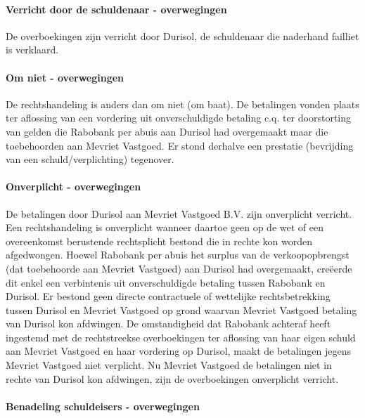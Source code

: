 \documentclass[
  dutch,
  a4paper,
]{article}
\begin{document}
\paragraph{Verricht door de schuldenaar - overwegingen}\label{verricht-door-de-schuldenaar---overwegingen-17}

De overboekingen zijn verricht door Durisol, de schuldenaar die naderhand failliet is verklaard.

\paragraph{Om niet - overwegingen}\label{om-niet---overwegingen-17}

De rechtshandeling is anders dan om niet (om baat). De betalingen vonden plaats ter aflossing van een vordering uit onverschuldigde betaling c.q. ter doorstorting van gelden die Rabobank per abuis aan Durisol had overgemaakt maar die toebehoorden aan Mevriet Vastgoed. Er stond derhalve een prestatie (bevrijding van een schuld/verplichting) tegenover.

\paragraph{Onverplicht - overwegingen}\label{onverplicht---overwegingen-17}

De betalingen door Durisol aan Mevriet Vastgoed B.V. zijn onverplicht verricht. Een rechtshandeling is onverplicht wanneer daartoe geen op de wet of een overeenkomst berustende rechtsplicht bestond die in rechte kon worden afgedwongen. Hoewel Rabobank per abuis het surplus van de verkoopopbrengst (dat toebehoorde aan Mevriet Vastgoed) aan Durisol had overgemaakt, creëerde dit enkel een verbintenis uit onverschuldigde betaling tussen Rabobank en Durisol. Er bestond geen directe contractuele of wettelijke rechtsbetrekking tussen Durisol en Mevriet Vastgoed op grond waarvan Mevriet Vastgoed betaling van Durisol kon afdwingen. De omstandigheid dat Rabobank achteraf heeft ingestemd met de rechtstreekse overboekingen ter aflossing van haar eigen schuld aan Mevriet Vastgoed en haar vordering op Durisol, maakt de betalingen jegens Mevriet Vastgoed niet verplicht. Nu Mevriet Vastgoed de betalingen niet in rechte van Durisol kon afdwingen, zijn de overboekingen onverplicht verricht.

\paragraph{Benadeling schuldeisers - overwegingen}\label{benadeling-schuldeisers---overwegingen-17}
\end{document}
